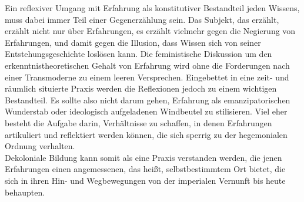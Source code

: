 Ein reflexiver Umgang mit Erfahrung als konstitutiver Bestandteil jeden Wissens,
muss dabei immer Teil einer Gegenerzählung sein. Das Subjekt, das erzählt,
erzählt nicht nur über Erfahrungen, es erzählt vielmehr gegen die Negierung von
Erfahrungen, und damit gegen die Illusion, dass Wissen sich von seiner
Entstehungsgeschichte loslösen kann. Die feministische Diskussion um den
erkenntnistheoretischen Gehalt von Erfahrung wird ohne die Forderungen nach
einer Transmoderne zu einem leeren Versprechen. Eingebettet in eine zeit- und
räumlich situierte Praxis werden die Reflexionen jedoch zu einem wichtigen
Bestandteil. Es sollte also nicht darum gehen, Erfahrung als emanzipatorischen
Wunderstab oder ideologisch aufgeladenen Windbeutel zu stilisieren. Viel eher
besteht die Aufgabe darin, Verhältnisse zu schaffen, in denen Erfahrungen
artikuliert und reflektiert werden können, die sich sperrig zu der hegemonialen
Ordnung verhalten.  \\
Dekoloniale Bildung kann somit als eine Praxis verstanden
werden, die jenen Erfahrungen einen angemessenen, das heißt, selbstbestimmtem
Ort bietet,  die sich in ihren Hin- und Wegbewegungen von der imperialen
Vernunft bis heute behaupten.


